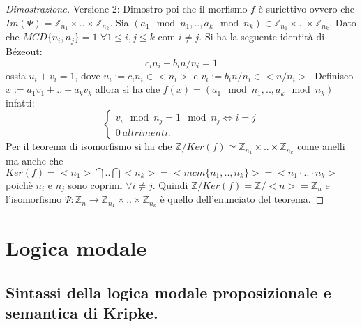 \documentclass{article}
\theoremstyle{definition}
\theoremstyle{plain}
\theoremstyle{plain}
\theoremstyle{plain}
\theoremstyle{plain}
\begin{document}
\begin{proof}[Dimostrazione]
    Versione 2: \newline
     Dimostro poi che il morfismo $f$ è suriettivo ovvero che $Im(\Psi) = \mathbb{Z}_{n_1} \times .. \times \mathbb{Z}_{n_k}$. 
    Sia $(a_1 \mod n_1, .., a_k \mod n_k) \in \mathbb{Z}_{n_1} \times .. \times \mathbb{Z}_{n_k}$. \newline
    Dato che $MCD\{n_i, n_j\} = 1$ $\forall 1 \le i, j \le k$ com $i \neq j$. 
    Si ha la seguente identità di Bézeout:
    \begin{equation}
        c_in_i + b_in/n_i = 1
    \end{equation}
    ossia $u_i + v_i = 1$, dove $u_i := c_in_i \in <n_i>$ e $v_i := b_in/n_i \in <n/n_i>$. \newline
    Definisco $x:= a_1v_1 + .. + a_kv_k$ allora si ha che $f(x) = (a_1 \mod n_1, .., a_k \mod n_k)$ infatti:
    $$
    \begin{cases}
         v_i \mod n_j = 1 \mod n_j \iff i = j \\
         0 \ altrimenti. 
    \end{cases}
    $$
    Per il teorema di isomorfismo si ha che $\mathbb{Z}/{Ker(f)} \simeq \mathbb{Z}_{n_1} \times .. \times \mathbb{Z}_{n_k}$ come anelli ma anche che $Ker(f) = <n_1> \bigcap .. \bigcap <n_k> = <mcm\{n_1, .., n_k\}> = <n_1 \cdot .. \cdot n_k>$ poichè $n_i$ e $n_j$ sono coprimi $\forall i \neq j$. \newline
    Quindi $\mathbb{Z}/{Ker(f) = \mathbb{Z}/{<n>} = \mathbb{Z}_n}$ e l'isomorfismo $\Psi : \mathbb{Z}_n \rightarrow \mathbb{Z}_{n_1} \times .. \times \mathbb{Z}_{n_k}$ è quello dell'enunciato del teorema.
\end{proof}

\section{Logica modale}
\subsection{Sintassi della logica modale proposizionale e semantica di Kripke.}
\end{document}
